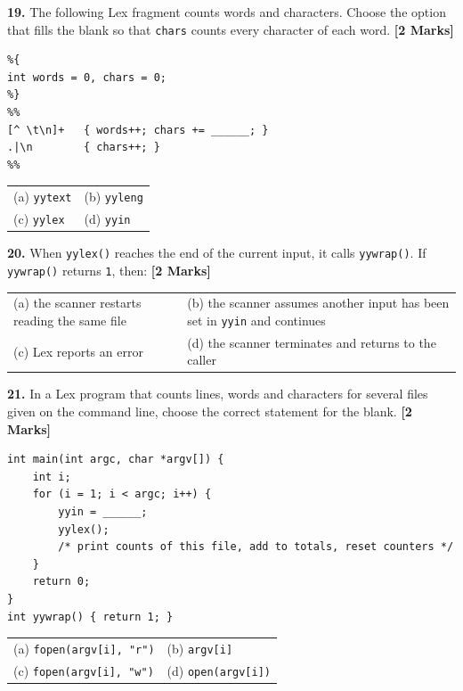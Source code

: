 \documentclass[11pt,a4paper]{article}
\begin{document}
\vspace{0.22cm}

\noindent \textbf{19.} The following Lex fragment counts words and characters. Choose the option that fills the blank so that \texttt{chars} counts every character of each word. \hfill \textbf{[2 Marks]}
\begin{lstlisting}
%{
int words = 0, chars = 0;
%}
%%
[^ \t\n]+   { words++; chars += ______; }
.|\n        { chars++; }
%%
\end{lstlisting}
\vspace{0.06cm}
\noindent
\begin{tabularx}{\textwidth}{@{}X X@{}}
(a) \texttt{yytext} & (b) \texttt{yyleng} \\[3pt]
(c) \texttt{yylex} & (d) \texttt{yyin} \\
\end{tabularx}

\vspace{0.22cm}

\noindent \textbf{20.} When \texttt{yylex()} reaches the end of the current input, it calls \texttt{yywrap()}. If \texttt{yywrap()} returns \texttt{1}, then: \hfill \textbf{[2 Marks]}
\vspace{0.06cm}
\noindent
\begin{tabularx}{\textwidth}{@{}X X@{}}
(a) the scanner restarts reading the same file & (b) the scanner assumes another input has been set in \texttt{yyin} and continues \\[3pt]
(c) Lex reports an error & (d) the scanner terminates and returns to the caller \\
\end{tabularx}

\vspace{0.22cm}

\noindent \textbf{21.} In a Lex program that counts lines, words and characters for several files given on the command line, choose the correct statement for the blank. \hfill \textbf{[2 Marks]}
\begin{lstlisting}
int main(int argc, char *argv[]) {
    int i;
    for (i = 1; i < argc; i++) {
        yyin = ______;
        yylex();
        /* print counts of this file, add to totals, reset counters */
    }
    return 0;
}
int yywrap() { return 1; }
\end{lstlisting}
\vspace{0.06cm}
\noindent
\begin{tabularx}{\textwidth}{@{}X X@{}}
(a) \texttt{fopen(argv[i], "r")} & (b) \texttt{argv[i]} \\[3pt]
(c) \texttt{fopen(argv[i], "w")} & (d) \texttt{open(argv[i])} \\
\end{tabularx}
\end{document}
